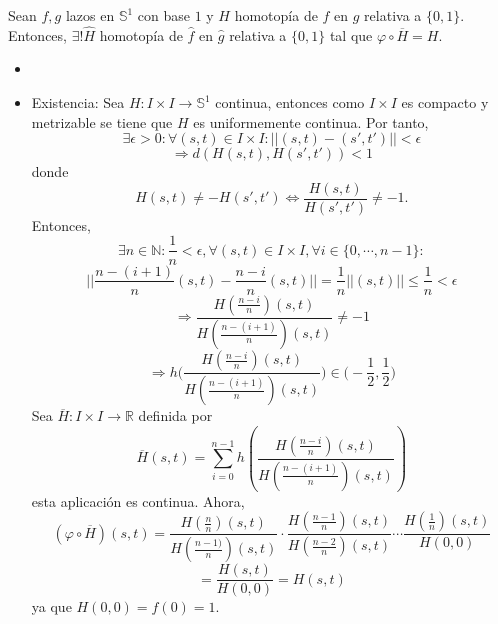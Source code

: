 \begin{lem}
  Sean $f,g$ lazos en $\mathbb{S}^{1}$ con base $1$ y $H$ homotopía de $f$ en $g$ relativa a $\{ 0, 1 \}$. Entonces, $\exists! \hat{H}$ homotopía de $\hat{ f }$ en $\hat{ g }$ relativa a $\{ 0, 1 \}$ tal que $\varphi \circ \overline{H} = H$.
\end{lem}

\begin{dem}
  \begin{itemize}
    \item []
    \item Existencia: Sea $H : I \times I \to \mathbb{S}^{1}$ continua, entonces como $I \times I$ es compacto y metrizable se tiene que $H$ es uniformemente continua. Por tanto,
      \[ 
        \exists \epsilon > 0 : \forall (s, t) \in I \times I : ||(s, t) - (s',t')|| < \epsilon 
      \] 
      \[ 
        \Rightarrow d(H(s,t), H(s', t')) < 1
      \] 
      donde
      \[ 
        H(s,t) \neq -H(s', t') \Leftrightarrow \frac{H(s,t)}{H(s',t')} \neq -1.
      \] 
      Entonces,
      \[ 
        \exists n \in \mathbb{N} : \frac{1}{n} < \epsilon, \forall (s,t) \in I \times I, \forall i \in \{ 0, \cdots, n - 1 \}:
      \] 
      \[ 
        ||\frac{n - (i + 1)}{n}(s, t) - \frac{n - i}{n}(s,t)|| = \frac{1}{n} ||(s, t)|| \leq \frac{1}{n} < \epsilon 
      \] 
      \[ 
        \Rightarrow \frac{H(\frac{n - i}{n})(s,t)}{H(\frac{n - (i + 1)}{n})(s,t)} \neq -1
      \] 
      \[ 
        \Rightarrow h \Bigg (\frac{H(\frac{n - i}{n})(s,t)}{H(\frac{n - (i + 1)}{n})(s,t)} \Bigg ) \in \Big ( -\frac{1}{2}, \frac{1}{2} \Big )
      \] 
      Sea $\overline{H} : I \times I \to \mathbb{R}$ definida por
      \[ 
        \overline{H}(s, t) = \sum_{i = 0}^{n - 1} h(\frac{H(\frac{n - i}{n})(s,t)}{H(\frac{n - (i + 1)}{n})(s,t)})
      \] 
      esta aplicación es continua. Ahora,
      \[ 
        (\varphi \circ \overline{H})(s,t) = \frac{H(\frac{n}{n})(s,t)}{H(\frac{n - 1)}{n})(s,t)} \cdot \frac{H(\frac{n - 1}{n})(s,t)}{H(\frac{n - 2}{n})(s,t)} \cdots \frac{H(\frac{1}{n})(s,t)}{H(0, 0)}
      \] 
      \[ 
        = \frac{H(s,t)}{H(0,0)} = H(s,t)
      \] 
      ya que $H(0, 0) = f(0) = 1$.
     

\end{itemize}
\end{dem}
